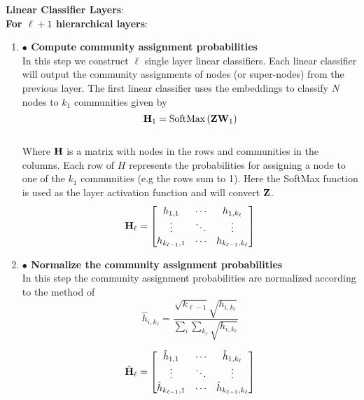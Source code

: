 \documentclass[a4paper,12pt]{article}
\newcommand{\forceindent}{\leavevmode{\parindent=2em\indent}}
\begin{document}
\begin{itemize}
\begin{enumerate}
{\begin{enumerate}
			\end{enumerate}
			\forceindent \textbf{Linear Classifier Layers}: \\
			\forceindent \textbf{For $\ell+1$ hierarchical layers}:
			\begin{enumerate}
				\item[]{\textbf{$\bullet$ Compute community assignment probabilities} 
					\\
					In this step we construct $\ell$ single layer linear classifiers. Each linear classifier will output the community assignments of nodes (or super-nodes) from the previous layer. The first linear classifier uses the embeddings to classify $N$ nodes to $k_1$ communities given by
					\[{\bf H}_{1} = \text{SoftMax}\left({\bf Z}{\bf W}_{1}\right) \]
					\\ 
					Where $\bf H$ is a matrix with nodes in the rows and communities in the columns. Each row of $H$ represents the probabilities for assigning a node to one of the $k_1$ communities (e.g the rows sum to 1). Here the SoftMax function is used as the layer activation function and will convert ${\bf Z}$. 
					\[{\bf H}_\ell = \begin{bmatrix}
						h_{1, 1} & \cdots & h_{1, k_\ell} \\
						\vdots  & \ddots & \vdots \\
						h_{k_{\ell - 1}, 1} & \cdots & h_{k_{\ell -1}, k_\ell} 
					\end{bmatrix}\]}
				
				\item[]{\textbf{$\bullet$ Normalize the community assignment probabilities}
					\\
					In this step the community assignment probabilities are normalized according to the method of %
					\[ \hat{h}_{i,k_\ell} = \frac{\sqrt{k_{\ell-1}} \sqrt{h_{i, k_\ell}}}{\sum_i \sum_{k_\ell} \sqrt{h_{i, k_\ell}}}\]
					
					\[\hat{\bf H}_\ell = \begin{bmatrix}
						\hat{h}_{1, 1} & \cdots & \hat{h}_{1, k_\ell} \\
						\vdots  & \ddots & \vdots \\
						\hat{h}_{k_{\ell - 1}, 1} & \cdots & \hat{h}_{k_{\ell -1}, k_\ell} 
					\end{bmatrix}\]
				}
				

\end{enumerate}}
\end{enumerate}
\end{itemize}
\end{document}
